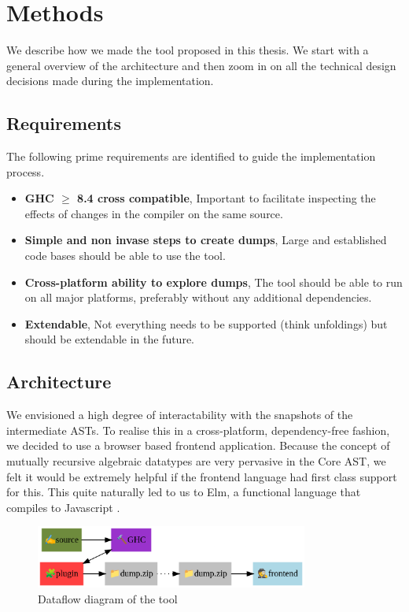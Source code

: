 \chapter{Methods}

We describe how we made the tool proposed in this thesis. We start with a general overview
of the architecture and then zoom in on all the technical design decisions made during the implementation.

\section{Requirements}

The following prime requirements are identified to guide the implementation process.

\begin{itemize}
  \item \textbf{GHC $\geq$ 8.4 cross compatible}, Important to facilitate inspecting the effects of changes in the compiler on the same source.
  \item \textbf{Simple and non invase steps to create dumps}, Large and established code bases should be able to use the tool.
  \item \textbf{Cross-platform ability to explore dumps}, The tool should be able to run on all major platforms, preferably without any additional dependencies.
  \item \textbf{Extendable}, Not everything needs to be supported (think unfoldings) but should be extendable in the future.
\end{itemize}

\section{Architecture}

We envisioned a high degree of interactability with the snapshots of the intermediate ASTs. To realise this
in a cross-platform, dependency-free fashion, we decided to use a browser based frontend application. 
Because the concept of mutually recursive algebraic datatypes are very pervasive in the Core AST, we felt it would be 
extremely helpful if the frontend language had first class support for this. This quite naturally led to us to Elm, a functional language
that compiles to Javascript \cite{elm_lang}.

\begin{figure}[h]
  \centering
  \includegraphics[width=0.8\textwidth]{figs/architecture.png}
  \caption{Dataflow diagram of the tool}
  \label{fig:architecture}
\end{figure}


